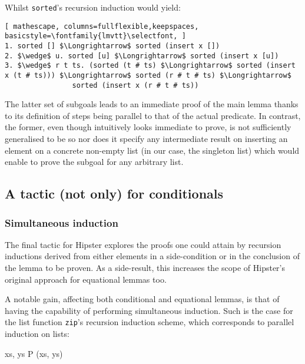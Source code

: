 \noindent Whilst \texttt{\selectfont sorted}'s recursion induction would yield:

\begin{lstlisting}[ mathescape, columns=fullflexible,keepspaces, basicstyle=\fontfamily{lmvtt}\selectfont, ]
1. sorted [] $\Longrightarrow$ sorted (insert x [])
2. $\wedge$ u. sorted [u] $\Longrightarrow$ sorted (insert x [u])
3. $\wedge$ r t ts. (sorted (t # ts) $\Longrightarrow$ sorted (insert x (t # ts))) $\Longrightarrow$ sorted (r # t # ts) $\Longrightarrow$
                sorted (insert x (r # t # ts))
\end{lstlisting}

The latter set of subgoals leads to an immediate proof of the main lemma thanks to its definition of steps being parallel to that of the actual predicate.
%
In contrast, the former, even though intuitively looks immediate to prove, is not sufficiently generalised to be so nor does it specify any intermediate result on inserting an element on a concrete non-empty list (in our case, the singleton list) which would enable to prove the subgoal for any arbitrary list.


\subsection{A tactic (not only) for conditionals}

\subsubsection*{Simultaneous induction}

The final tactic for Hipster explores the proofs one could attain by recursion inductions derived from either elements in a side-condition or in the conclusion of the lemma to be proven.
%
As a side-result, this increases the scope of Hipster's original approach for equational lemmas too.

A notable gain, affecting both conditional and equational lemmas, is that of having the capability of performing simultaneous induction.
%
Such is the case for the list function \texttt{\selectfont zip}'s recursion induction scheme, which corresponds to parallel induction on lists:

  {\forall xs, \; ys \;\; P (xs,\; ys)}

